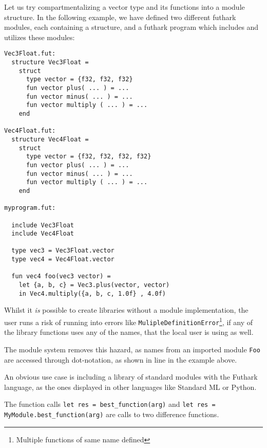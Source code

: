 Let us try compartmentalizing a vector type and its functions into a module
structure.
In the following example, we have defined two different futhark modules, each
containing a structure,
and a futhark program which includes and utilizes these modules:
\begin{verbatim}
Vec3Float.fut:
  structure Vec3Float = 
    struct
      type vector = {f32, f32, f32}
      fun vector plus( ... ) = ...
      fun vector minus( ... ) = ...
      fun vector multiply ( ... ) = ...
    end

Vec4Float.fut:
  structure Vec4Float = 
    struct
      type vector = {f32, f32, f32, f32}
      fun vector plus( ... ) = ...
      fun vector minus( ... ) = ...
      fun vector multiply ( ... ) = ...
    end
  
myprogram.fut:

  include Vec3Float
  include Vec4Float

  type vec3 = Vec3Float.vector
  type vec4 = Vec4Float.vector
  
  fun vec4 foo(vec3 vector) = 
    let {a, b, c} = Vec3.plus(vector, vector)
    in Vec4.multiply({a, b, c, 1.0f} , 4.0f)
\end{verbatim}

Whilst it \textit{is} possible to create libraries without a module
implementation, the user runs a risk of running into errors like
\texttt{MulipleDefinitionError}\footnote{Multiple functions of same name
  defined}, if any of the library functions uses any of the names, that the
local user is using as well.

The module system removes this hazard, as names from an imported module
\texttt{Foo} are accessed through dot-notation, as shown in line %
in the example above.

An obvious use case is including a library of standard modules with the Futhark
language, as the ones displayed in other languages like Standard
ML\cite{sml_standard_lib} or Python\cite{python3_docs}.

The function calls \texttt{let res = best_function(arg)} and
\texttt{let res = MyModule.best_function(arg)} are calls to two difference
functions.

